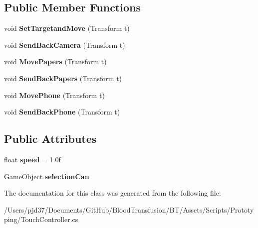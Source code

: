 \subsection*{Public Member Functions}
\begin{DoxyCompactItemize}
\item 
void {\bfseries Set\+Targetand\+Move} (Transform t)\hypertarget{class_touch_controller_a000c85d26f9249d61906fdad608af737}{}\label{class_touch_controller_a000c85d26f9249d61906fdad608af737}

\item 
void {\bfseries Send\+Back\+Camera} (Transform t)\hypertarget{class_touch_controller_a1519533df21d9dd71eda32b16cf0a5e6}{}\label{class_touch_controller_a1519533df21d9dd71eda32b16cf0a5e6}

\item 
void {\bfseries Move\+Papers} (Transform t)\hypertarget{class_touch_controller_a21920ea0c1ea226c8562301b8c3db384}{}\label{class_touch_controller_a21920ea0c1ea226c8562301b8c3db384}

\item 
void {\bfseries Send\+Back\+Papers} (Transform t)\hypertarget{class_touch_controller_af2cdd9fdf9f271307e08c411ea580fb0}{}\label{class_touch_controller_af2cdd9fdf9f271307e08c411ea580fb0}

\item 
void {\bfseries Move\+Phone} (Transform t)\hypertarget{class_touch_controller_a2b4255edd1cfcdec2602d4c61b6fe80a}{}\label{class_touch_controller_a2b4255edd1cfcdec2602d4c61b6fe80a}

\item 
void {\bfseries Send\+Back\+Phone} (Transform t)\hypertarget{class_touch_controller_a0fcb63aece4c4619703abf20a7109cb0}{}\label{class_touch_controller_a0fcb63aece4c4619703abf20a7109cb0}

\end{DoxyCompactItemize}
\subsection*{Public Attributes}
\begin{DoxyCompactItemize}
\item 
float {\bfseries speed} = 1.\+0f\hypertarget{class_touch_controller_a8c25a0ff35e45cb89224562ce9e3fb8a}{}\label{class_touch_controller_a8c25a0ff35e45cb89224562ce9e3fb8a}

\item 
Game\+Object {\bfseries selection\+Can}\hypertarget{class_touch_controller_ad559a9348408f4e9a06b6c94d24df3a8}{}\label{class_touch_controller_ad559a9348408f4e9a06b6c94d24df3a8}

\end{DoxyCompactItemize}


The documentation for this class was generated from the following file\+:\begin{DoxyCompactItemize}
\item 
/\+Users/pjd37/\+Documents/\+Git\+Hub/\+Blood\+Transfusion/\+B\+T/\+Assets/\+Scripts/\+Prototyping/Touch\+Controller.\+cs\end{DoxyCompactItemize}
